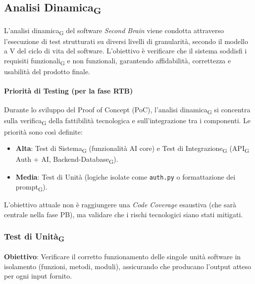 \documentclass[11pt,a4paper]{article}
\newcommand{\gls}[1]{#1\textsubscript{G}}
\begin{document}
\newpage
\subsection{\gls{Analisi Dinamica}}
L'\gls{analisi dinamica} del software \textit{Second Brain} viene condotta attraverso l'esecuzione di test strutturati su diversi livelli di granularità, secondo il modello a V del ciclo di vita del software. L'obiettivo è verificare che il sistema soddisfi i \gls{requisiti funzionali} e non funzionali, garantendo affidabilità, correttezza e usabilità del prodotto finale.

\paragraph{Priorità di Testing (per la fase RTB)}
Durante lo sviluppo del Proof of Concept (PoC), l'\gls{analisi dinamica} si concentra sulla \gls{verifica} della fattibilità tecnologica e sull'integrazione tra i componenti. Le priorità sono così definite:
\begin{itemize}
    \item \textbf{Alta}: \gls{Test di Sistema} (funzionalità AI core) e \gls{Test di Integrazione} (\gls{API} Auth + AI, Backend-\gls{Database}).
    \item \textbf{Media}: Test di Unità (logiche isolate come \texttt{auth.py} o formattazione dei \gls{prompt}).
\end{itemize}
L'obiettivo attuale non è raggiungere una \textit{Code Coverage} esaustiva (che sarà centrale nella fase PB), ma validare che i rischi tecnologici siano stati mitigati.

\subsubsection{Test di Unità\textsubscript{G}}
\textbf{Obiettivo}: Verificare il corretto funzionamento delle singole unità software in isolamento (funzioni, metodi, moduli), assicurando che producano l'output atteso per ogni input fornito.
\end{document}

